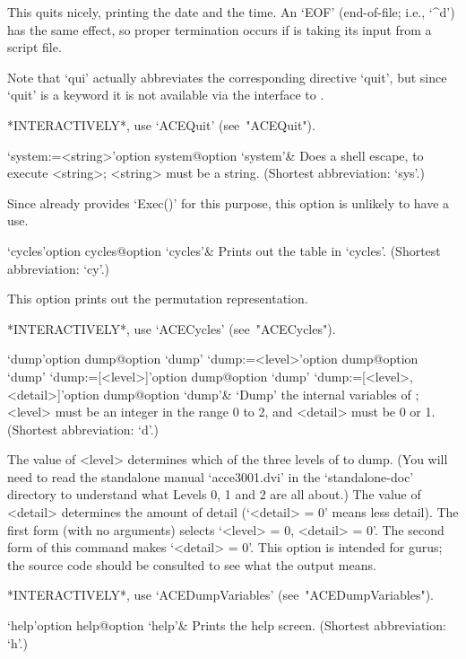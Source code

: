 This quits {\ACE} nicely, printing the date and  the  time.  An  `EOF'
(end-of-file;  i.e.,  `\^{}d')  has  the  same   effect,   so   proper
termination occurs if {\ACE} is taking its input from a script file.

Note  that  `qui'  actually  abbreviates  the   corresponding   {\ACE}
directive `quit', but since `quit' is  a  {\GAP}  keyword  it  is  not
available via the {\GAP} interface to {\ACE}.

*INTERACTIVELY*, use `ACEQuit' (see~"ACEQuit").

\>`system:=<string>'{option system}@{option `system'}&
Does a shell escape, to execute <string>; <string> must be a string.
(Shortest abbreviation: `sys'.)

Since {\GAP} already provides `Exec()' for this purpose,  this  option
is unlikely to have a use.

\enditems


\beginitems

\>`cycles'{option cycles}@{option `cycles'}&
Prints out the table in `cycles'. (Shortest abbreviation: `cy'.)

This option prints out the permutation representation.

*INTERACTIVELY*, use `ACECycles' (see~"ACECycles").

\>`dump'{option dump}@{option `dump'}
\>`dump:=<level>'{option dump}@{option `dump'}
\>`dump:=[<level>]'{option dump}@{option `dump'}
\>`dump:=[<level>, <detail>]'{option dump}@{option `dump'}&
`Dump' the internal variables of {\ACE}; <level> must be an integer in
the range 0 to 2, and <detail> must be 0 or 1.
(Shortest abbreviation: `d'.)

The value of <level> determines which of the three levels of {\ACE} to
dump. (You will need to read the standalone manual  `acce3001.dvi'  in
the `standalone-doc' directory to understand what Levels 0,  1  and  2
are all about.) The value of <detail> determines the amount of  detail
(`<detail> = 0' means less detail). The first form (with no arguments)
selects `<level> = 0, <detail> = 0'. The second form of  this  command
makes `<detail> = 0'. This option is intended for  gurus;  the  source
code should be consulted to see what the output means.

*INTERACTIVELY*, use `ACEDumpVariables' (see~"ACEDumpVariables").

\>`help'{option help}@{option `help'}&
Prints the {\ACE} help screen. (Shortest abbreviation: `h'.)

